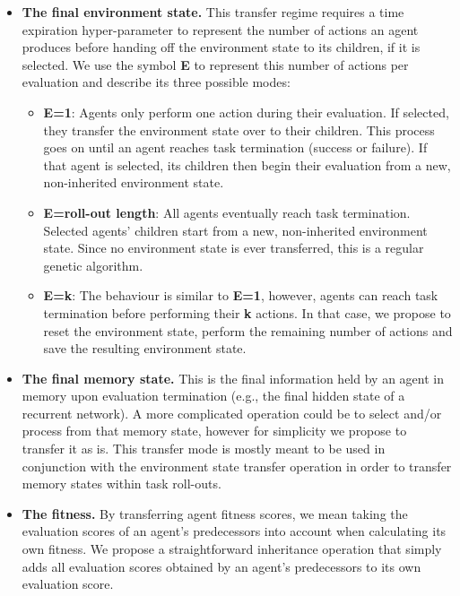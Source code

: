 \documentclass[dvipsnames,format=sigconf,anonymous=false,review=false]{acmart}
\begin{document}
\begin{itemize}

\item \textbf{The final environment state.} This transfer regime requires a time expiration hyper-parameter to represent the number of actions an agent produces before handing off the environment state to its children, if it is selected. We use the symbol \textbf{E} to represent this number of actions per evaluation and describe its three possible modes:

\begin{itemize}

\item \textbf{E=1}: Agents only perform one action during their evaluation. If selected, they transfer the environment state over to their children. This process goes on until an agent reaches task termination (success or failure). If that agent is selected, its children then begin their evaluation from a new, non-inherited environment state. 

\item \textbf{E=roll-out length}: All agents eventually reach task termination. Selected agents’ children start from a new, non-inherited environment state. Since no environment state is ever transferred, this is a regular genetic algorithm.

\item \textbf{E=k}: The behaviour is similar to \textbf{E=1}, however, agents can reach task termination before performing their \textbf{k} actions. In that case, we propose to reset the environment state, perform the remaining number of actions and save the resulting environment state. 

\end{itemize}

\item \textbf{The final memory state.} This is the final information held by an agent in memory upon evaluation termination (e.g., the final hidden state of a recurrent network). A more complicated operation could be to select and/or process from that memory state, however for simplicity we propose to transfer it as is. This transfer mode is mostly meant to be used in conjunction with the environment state transfer operation in order to transfer memory states within task roll-outs.

\item \textbf{The fitness.} By transferring agent fitness scores, we mean taking the evaluation scores of an agent's predecessors into account when calculating its own fitness. We propose a straightforward inheritance operation that simply adds all evaluation scores obtained by an agent's predecessors to its own evaluation score.

\end{itemize}
\end{document}
